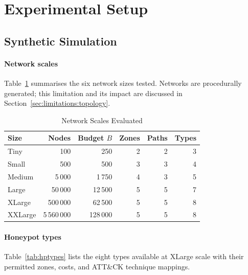 \documentclass[journal]{IEEEtran}
\begin{document}
\section{Experimental Setup}
\label{sec:eval}

\subsection{Synthetic Simulation}
\label{sec:eval:sim}

\paragraph{Network scales}
Table~\ref{tab:scales} summarises the six network sizes tested.
Networks are procedurally generated; this limitation and its impact
are discussed in Section~\ref{sec:limitations:topology}.

\begin{table}[t]
\caption{Network Scales Evaluated}
\label{tab:scales}
\centering
\renewcommand{\arraystretch}{1.2}
\begin{tabular}{lrrrrr}
\toprule
Size & Nodes & Budget $B$ & Zones & Paths & Types \\
\midrule
Tiny    & 100            & 250      & 2 & 2 & 3 \\
Small   & 500            & 500      & 3 & 3 & 4 \\
Medium  & 5\,000         & 1\,750   & 4 & 3 & 5 \\
Large   & 50\,000        & 12\,500  & 5 & 5 & 7 \\
XLarge  & 500\,000       & 62\,500  & 5 & 5 & 8 \\
XXLarge & 5\,560\,000    & 128\,000 & 5 & 5 & 8 \\
\bottomrule
\end{tabular}
\end{table}

\paragraph{Honeypot types}
Table~\ref{tab:hptypes} lists the eight types available at XLarge scale
with their permitted zones, costs, and ATT\&CK technique mappings.
\end{document}
